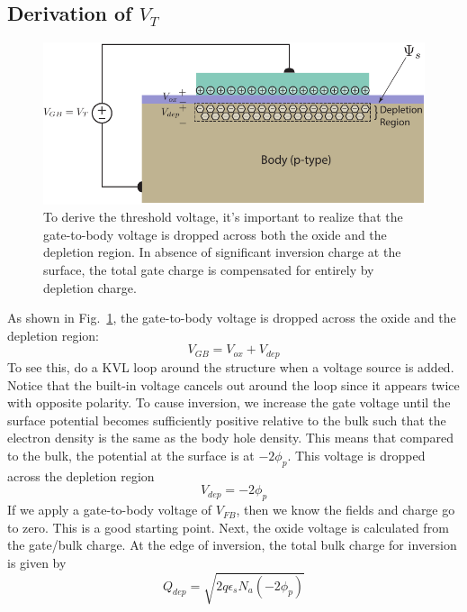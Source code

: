 \subsection{Derivation of \texorpdfstring{$V_T$}{Threshold Voltage}}
\begin{figure}[tbh]
\centering
\includegraphics[width=.75\columnwidth]{mos_cap_threshold}
\caption{To derive the threshold voltage, it's important to realize that the gate-to-body voltage is dropped across both the oxide and the depletion region.  In absence of significant inversion charge at the surface, the total gate charge is compensated for entirely by depletion charge.}
\label{fig:mos_vt_derive}
\end{figure} 
As shown in Fig.~\ref{fig:mos_vt_derive}, the gate-to-body voltage is dropped across the oxide and the depletion region:
    \begin{equation}
        V_{GB} = V_{ox} + V_{dep}
    \end{equation}
To see this, do a KVL loop around the structure when a voltage source is added.   Notice that the built-in voltage cancels out around the loop since it appears twice with opposite polarity.   To cause inversion, we increase the gate voltage until the surface potential becomes sufficiently positive relative to the bulk such that the electron density is the same as the body hole density.  This means that compared to the bulk, the potential at the surface is at $-2\phi_p$.  This voltage is dropped across the depletion region
    \begin{equation}
        V_{dep} = -2 \phi_p
    \end{equation}
If we apply a gate-to-body voltage of $V_{FB}$, then we know the fields and charge go to zero. This is a good starting point.  Next, the oxide voltage is calculated from the gate/bulk charge.  At the edge of inversion, the total bulk charge for inversion is given by 
    \begin{equation}
        Q_{dep} = \sqrt{2 q \epsilon_s N_a (-2 \phi_p) }
    \end{equation}
